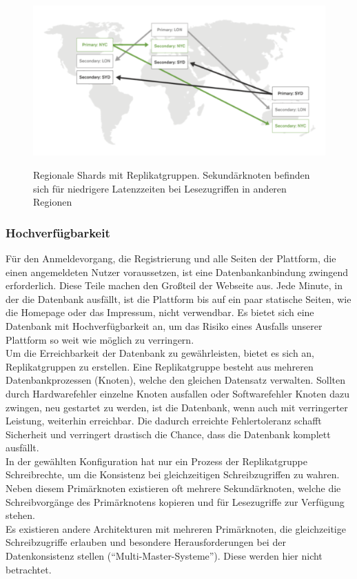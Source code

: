 \begin{figure}
	\centering
    \includegraphics[width=\textwidth]{sources/MongoDB_sharded.png}\cite{db:mongoActiveActiveImage}
	\caption{Regionale Shards mit Replikatgruppen. Sekundärknoten befinden sich für niedrigere Latenzzeiten bei Lesezugriffen in anderen Regionen}
	\label{fig:mongoActiveActive}
\end{figure}

\subsubsection{Hochverfügbarkeit}
Für den Anmeldevorgang, die Registrierung und alle Seiten der Plattform, die einen angemeldeten Nutzer voraussetzen, ist eine Datenbankanbindung zwingend erforderlich.
Diese Teile machen den Großteil der Webseite aus.
Jede Minute, in der die Datenbank ausfällt, ist die Plattform bis auf ein paar statische Seiten, wie die Homepage oder das Impressum, nicht verwendbar.
Es bietet sich eine Datenbank mit Hochverfügbarkeit an, um das Risiko eines Ausfalls unserer Plattform so weit wie möglich zu verringern.\\
Um die Erreichbarkeit der Datenbank zu gewährleisten, bietet es sich an, Replikatgruppen zu erstellen.
Eine Replikatgruppe besteht aus mehreren Datenbankprozessen (Knoten), welche den gleichen Datensatz verwalten. \cite{db:mongoReplicaSetMembers}
Sollten durch Hardwarefehler einzelne Knoten ausfallen oder Softwarefehler Knoten dazu zwingen, neu gestartet zu werden, ist die Datenbank, wenn auch mit verringerter Leistung, weiterhin erreichbar.
Die dadurch erreichte Fehlertoleranz schafft Sicherheit und verringert drastisch die Chance, dass die Datenbank komplett ausfällt.\\
In der gewählten Konfiguration hat nur ein Prozess der Replikatgruppe Schreibrechte, um die Konsistenz bei gleichzeitigen Schreibzugriffen zu wahren.
Neben diesem Primärknoten existieren oft mehrere Sekundärknoten, welche die Schreibvorgänge des Primärknotens kopieren und für Lesezugriffe zur Verfügung stehen.\\
Es existieren andere Architekturen mit mehreren Primärknoten, die gleichzeitige Schreibzugriffe erlauben und besondere Herausforderungen bei der Datenkonsistenz stellen (\enquote{Multi-Master-Systeme}).
Diese werden hier nicht betrachtet.

